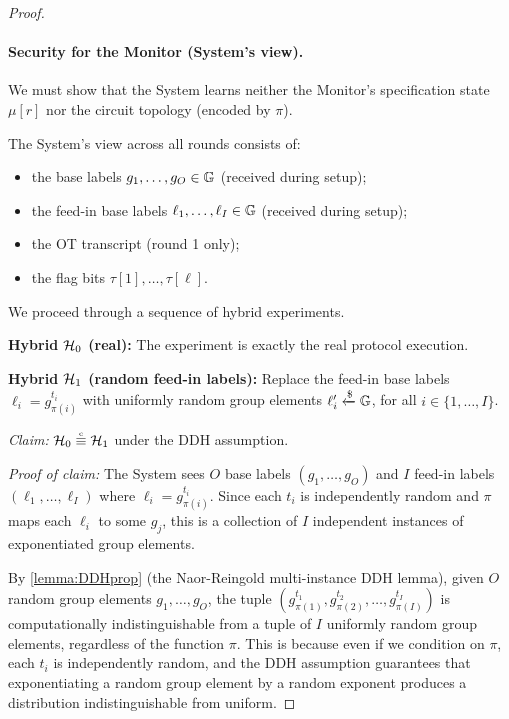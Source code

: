 \begin{proof}
\paragraph{Security for the Monitor (System's view).}
We must show that the System learns neither the Monitor's specification state $\mu[r]$ nor the circuit topology (encoded by $\pi$).

The System's view across all rounds consists of:
\begin{itemize}
    \item the base labels $g_1, \ldots, g_O \in \mathbb{G}$ (received during setup);
    \item the feed-in base labels $\ell_1, \ldots, \ell_I \in \mathbb{G}$ (received during setup);
    \item the OT transcript (round 1 only);
    \item the flag bits $\tau[1], \ldots, \tau[\ell]$.
\end{itemize}

We proceed through a sequence of hybrid experiments.

\medskip
\noindent\textbf{Hybrid $\mathcal{H}_0$ (real):} The experiment is exactly the real protocol execution.

\medskip
\noindent\textbf{Hybrid $\mathcal{H}_1$ (random feed-in labels):} Replace the feed-in base labels $\ell_i = g_{\pi(i)}^{t_i}$ with uniformly random group elements $\ell_i' \xleftarrow{\$} \mathbb{G}$, for all $i \in \{1, \ldots, I\}$.

\medskip
\noindent\emph{Claim:} $\Hc_0 \indistinguishable \Hc_1$ under the DDH assumption.

\noindent\emph{Proof of claim:} The System sees $O$ base labels $(g_1, \ldots, g_O)$ and $I$ feed-in labels $(\ell_1, \ldots, \ell_I)$ where $\ell_i = g_{\pi(i)}^{t_i}$. Since each $t_i$ is independently random and $\pi$ maps each $\ell_i$ to some $g_j$, this is a collection of $I$ independent instances of exponentiated group elements.

By \cref{lemma:DDHprop} (the Naor-Reingold multi-instance DDH lemma), given $O$ random group elements $g_1, \ldots, g_O$, the tuple $(g_{\pi(1)}^{t_1}, g_{\pi(2)}^{t_2}, \ldots, g_{\pi(I)}^{t_I})$ is computationally indistinguishable from a tuple of $I$ uniformly random group elements, regardless of the function $\pi$. This is because even if we condition on $\pi$, each $t_i$ is independently random, and the DDH assumption guarantees that exponentiating a random group element by a random exponent produces a distribution indistinguishable from uniform.


\end{proof}
